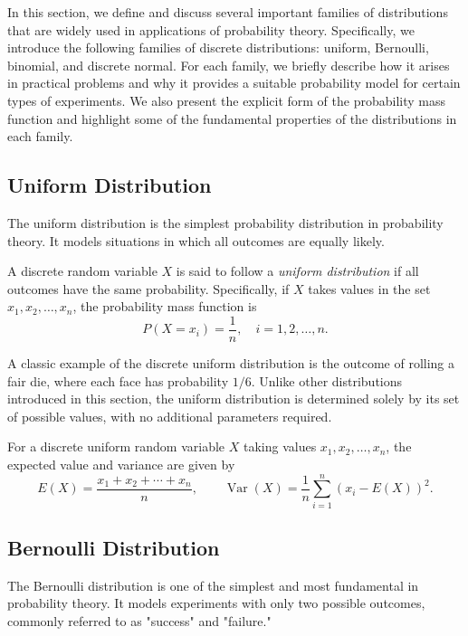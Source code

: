 In this section, we define and discuss several important families of distributions that are widely used in applications of probability theory. Specifically, we introduce the following families of discrete distributions: uniform, Bernoulli, binomial, and discrete normal. For each family, we briefly describe how it arises in practical problems and why it provides a suitable probability model for certain types of experiments. We also present the explicit form of the probability mass function and highlight some of the fundamental properties of the distributions in each family.

%
%

\subsection{Uniform Distribution}

The uniform distribution is the simplest probability distribution in probability theory. It models situations in which all outcomes are equally likely.

\begin{definition}
A discrete random variable $X$ is said to follow a \emph{uniform distribution} if all outcomes have the same probability. Specifically, if $X$ takes values in the set ${x_1, x_2, \ldots, x_n}$, the probability mass function is
\[
P(X = x_i) = \frac{1}{n}, \quad i = 1, 2, \ldots, n.
\]
\end{definition}

A classic example of the discrete uniform distribution is the outcome of rolling a fair die, where each face has probability $1/6$. Unlike other distributions introduced in this section, the uniform distribution is determined solely by its set of possible values, with no additional parameters required.

For a discrete uniform random variable $X$ taking values ${x_1, x_2, \ldots, x_n}$, the expected value and variance are given by
\[
E(X) = \frac{x_1 + x_2 + \cdots + x_n}{n}, \qquad
\operatorname{Var}(X) = \frac{1}{n} \sum_{i=1}^n (x_i - E(X))^2.
\]

%
%

\subsection{Bernoulli Distribution}

The Bernoulli distribution is one of the simplest and most fundamental in probability theory. It models experiments with only two possible outcomes, commonly referred to as "success" and "failure."

